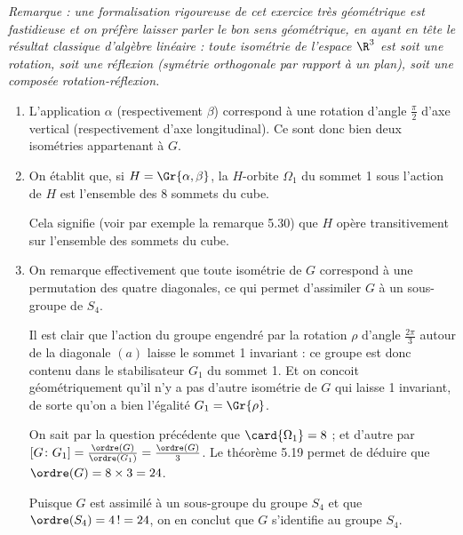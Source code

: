 
\emph{Remarque : une formalisation rigoureuse de cet exercice très géométrique est fastidieuse et on préfère laisser parler le bon sens géométrique, en ayant en tête le résultat classique d'algèbre linéaire : toute isométrie de l'espace $\R^3$ est soit une rotation, soit une réflexion (symétrie orthogonale par rapport à un plan), soit une composée rotation-réflexion.}
\begin{enumerate}
\item L'application $\alpha$ (respectivement $\beta$) correspond à une rotation d'angle $\frac{\pi}{2}$ d'axe vertical (respectivement d'axe longitudinal). Ce sont donc bien deux isométries appartenant à $G$.
\item On établit que, si $H =\Gr{\alpha, \beta}$, la $H$-orbite $\Omega_1$ du sommet 1 sous l'action de $H$ est l'ensemble des 8 sommets du cube.

Cela signifie (voir par exemple la remarque 5.30) que $H$ opère transitivement sur l'ensemble des sommets du cube.

\item On remarque effectivement que toute isométrie de $G$ correspond à une permutation des quatre diagonales, ce qui permet d'assimiler $G$ à un sous-groupe de $S_4$.

Il est clair que l'action du groupe engendré par la rotation $\rho$ d'angle $\frac{2\pi}{3}$ autour de la diagonale $(a)$ laisse le sommet 1 invariant : ce groupe est donc contenu dans le stabilisateur $G_1$ du sommet 1. Et on concoit géométriquement qu'il n'y a pas d'autre isométrie de $G$ qui laisse 1 invariant, de sorte qu'on a bien l'égalité $G_1 = \Gr{\rho}$.

On sait par la question précédente que $\card{\Omega_1} =8$ ; et d'autre par $[G\colon G_1] = \frac{\ordre(G)}{\ordre(G_1)} = \frac{\ordre(G)}{3}$. Le théorème 5.19 permet de déduire que $\ordre(G) = 8\times 3 = 24$.

Puisque $G$ est assimilé à un sous-groupe du groupe $S_4$ et que $\ordre(S_4) = 4\,! = 24$, on en conclut que $G$ s'identifie au groupe $S_4$.
\end{enumerate}

